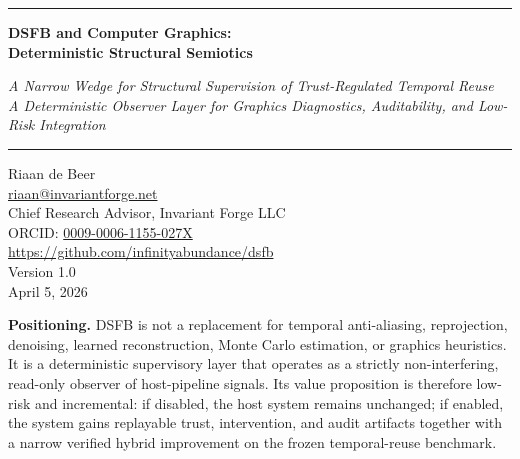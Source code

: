 \documentclass[11pt,letterpaper]{article}
\theoremstyle{gcresult}
\theoremstyle{definition}
\begin{document}
\begin{center}
{\color{GCblue}\rule{\linewidth}{1.5pt}}
\vspace{8pt}

{\LARGE\bfseries\color{GCblue}
DSFB and Computer Graphics:\\[6pt]
Deterministic Structural Semiotics}

\vspace{6pt}
{\large\itshape\color{GCaccent}
A Narrow Wedge for Structural Supervision of Trust-Regulated Temporal Reuse\\
A Deterministic Observer Layer for Graphics Diagnostics, Auditability, and Low-Risk Integration}

\vspace{8pt}
{\color{GCblue}\rule{\linewidth}{0.8pt}}

\vspace{12pt}

{\normalsize
Riaan de Beer\\
\href{mailto:riaan@invariantforge.net}{riaan@invariantforge.net}\\
Chief Research Advisor, Invariant Forge LLC\\
ORCID: \href{https://orcid.org/0009-0006-1155-027X}{0009-0006-1155-027X}\\
\href{https://github.com/infinityabundance/dsfb}{https://github.com/infinityabundance/dsfb}\\[4pt]
Version 1.0\\
April 5, 2026}

\vspace{8pt}
\begin{minipage}{0.92\linewidth}
\begin{tcolorbox}[augbox]
\small
\textbf{Positioning.} DSFB is not a replacement for temporal anti-aliasing, reprojection, denoising, learned reconstruction, Monte Carlo estimation, or graphics heuristics. It is a deterministic supervisory layer that operates as a strictly non-interfering, read-only observer of host-pipeline signals. Its value proposition is therefore low-risk and incremental: if disabled, the host system remains unchanged; if enabled, the system gains replayable trust, intervention, and audit artifacts together with a narrow verified hybrid improvement on the frozen temporal-reuse benchmark.
\end{tcolorbox}
\end{minipage}
\end{center}
\end{document}
